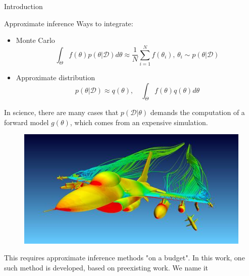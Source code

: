 \documentclass[pdf]{beamer}
\begin{document}
\begin{frame}{Introduction}
\begin{block}{Approximate inference}
Ways to integrate:
\begin{itemize}
	\item Monte Carlo
	\begin{equation*}
	\int_\Theta f(\theta) p(\theta|\mathcal{D}) d\theta \approx \frac{1}{N} \sum_{i=1}^N f(\theta_i), \, \theta_i \sim p(\theta|\mathcal{D})
	\end{equation*}
	\item Approximate distribution
	\begin{equation*}
	p(\theta|\mathcal{D}) \approx q(\theta), \quad \int_\Theta  f(\theta) q(\theta) d\theta
	\end{equation*}
\end{itemize}

\pause
\begin{block}{}
\end{block}

\end{block}
\end{frame}

\begin{frame}
\begin{block}{}
In science, there are many cases that $p(\mathcal{D}|\theta)$ demands the computation of a forward model $g(\theta)$, which comes from an expensive simulation.
  \begin{figure}[h]
	\centering
	\includegraphics[height=0.3\paperheight]{figs/simulation_figure.jpg}
\end{figure}
\pause
This requires approximate inference methods "on a budget". In this work, one such method is developed, based on preexisting work. We name it
\pause 
\begin{block}{}
\end{block}
\end{block}
\end{frame}
\end{document}
